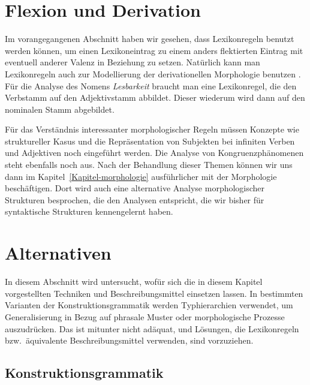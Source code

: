 \section{Flexion und Derivation}
\label{sec-lexikon-felx-deriv}

%
%
Im vorangegangenen Abschnitt haben wir gesehen, dass Lexikonregeln benutzt werden können, um einen
Lexikoneintrag zu einem anders flektierten Eintrag mit eventuell anderer Valenz in Beziehung zu setzen.
Natürlich kann man Lexikonregeln auch zur Modellierung der derivationellen Morphologie benutzen \citep{Riehemann93a,Riehemann97a}.
Für die Analyse des Nomens \emph{Lesbarkeit} braucht man eine Lexikonregel, die den Verbstamm
 auf den Adjektivstamm  abbildet. Dieser wiederum wird dann auf den nominalen
Stamm  abgebildet.

Für das Verständnis interessanter morphologischer Regeln müssen Konzepte wie struktureller Kasus
und die Repräsentation von Subjekten bei infiniten Verben und Adjektiven noch eingeführt werden.
Die Analyse von Kongruenzphänomenen steht ebenfalls noch aus. Nach der Behandlung dieser Themen
können wir uns dann im Kapitel~\ref{Kapitel-morphologie} ausführlicher mit der Morphologie beschäftigen.
Dort wird auch eine alternative Analyse morphologischer Strukturen besprochen, die den Analysen
entspricht, die wir bisher für syntaktische Strukturen kennengelernt haben.%
%
%



\section{Alternativen}

\mbox{}%
In diesem Abschnitt wird untersucht, wofür sich die in diesem Kapitel vorgestellten Techniken und Beschreibungsmittel
einsetzen lassen. In bestimmten Varianten der Konstruktionsgrammatik werden Typhierarchien verwendet, um Generalisierung in Bezug
auf phrasale Muster oder morphologische Prozesse auszudrücken. Das ist mitunter nicht adäquat, und Lösungen,
die Lexikonregeln bzw.\ äquivalente Beschreibungsmittel verwenden, sind vorzuziehen.

\subsection{Konstruktionsgrammatik}
\label{Abschnitt-Konstruktionsgrammatik-phrasal}


